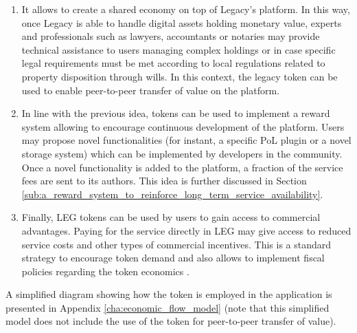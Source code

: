 \begin{enumerate}
	\item It allows to create a shared economy on top of Legacy's platform. In this way, once Legacy is able to handle digital assets holding monetary value, experts and professionals such as lawyers, accountants or notaries may provide technical assistance to users managing complex holdings or in case specific legal requirements must be met according to local regulations related to property disposition through wills. In this context, the legacy token can be used to enable peer-to-peer transfer of value on the platform.
	\item In line with the previous idea, tokens can be used to implement a reward system allowing to encourage continuous development of the platform. Users may propose novel functionalities (for instant, a specific PoL plugin or a novel storage system) which can be implemented by developers in the community. Once a novel functionality is added to the platform, a fraction of the service fees are sent to its authors.
	This idea is further discussed in Section \ref{sub:a_reward_system_to_reinforce_long_term_service_availability}.
	\item Finally, LEG tokens can be used by users to gain access to commercial advantages. Paying for the service directly in LEG may give access to reduced service costs and other types of commercial incentives. This is a standard strategy to encourage token demand and also allows to implement fiscal policies regarding the token economics \cite{Sehra2017}.

\end{enumerate}

A simplified diagram showing how the token is employed in the application is presented in Appendix \ref{cha:economic_flow_model} (note that this simplified model does not include the use of the token for peer-to-peer transfer of value).


